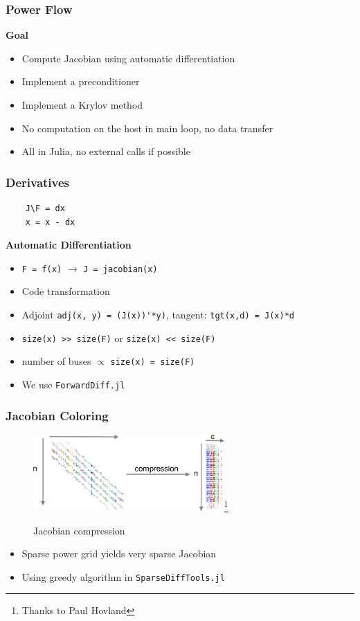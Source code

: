 \begin{frame}
  \frametitle{Power Flow}
  {\bf Goal}
  \begin{itemize}
    \item Compute Jacobian using automatic differentiation
    \item Implement a preconditioner
    \item Implement a Krylov method
    \item No computation on the host in main loop, no data transfer
    \item All in Julia, no external calls if possible
  \end{itemize}
\end{frame}

\begin{frame}[fragile]
  \frametitle{Derivatives}
  \begin{center}
  \lstset{linewidth = 0.25\textwidth, frame=tb}
    \begin{lstlisting}
    J\F = dx
    x = x - dx
    \end{lstlisting}
  \end{center}
  \lstset{linewidth = \textwidth}
  {\bf Automatic Differentiation}
  \begin{itemize}
    \item \lstinline{F = f(x)} $\rightarrow$ \lstinline{J = jacobian(x)}
    \item Code transformation
    \item Adjoint \lstinline{adj(x, y) = (J(x))'*y)}, tangent: \lstinline{tgt(x,d) = J(x)*d} 
    \item \lstinline{size(x) >> size(F)} or \lstinline{size(x) << size(F)}
    \item number of buses $\propto$ \lstinline{size(x) = size(F)}
    \item We use \lstinline{ForwardDiff.jl}
  \end{itemize}
\end{frame}

\begin{frame}
  \frametitle{Jacobian Coloring}
  \begin{center}
    \begin{figure}
      \includegraphics[width=0.65\textwidth]{figures/compression}\footnote{Thanks to Paul Hovland}
      \caption{Jacobian compression}
    \end{figure}
  \end{center}
  \begin{itemize}
    \item Sparse power grid yields very sparse Jacobian
    \item Using greedy algorithm in \lstinline{SparseDiffTools.jl}
  \end{itemize}
\end{frame}

